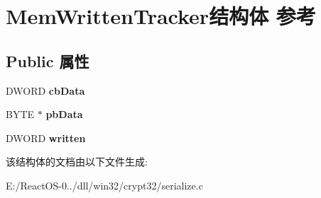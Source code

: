 \hypertarget{struct_mem_written_tracker}{}\section{Mem\+Written\+Tracker结构体 参考}
\label{struct_mem_written_tracker}
\subsection*{Public 属性}
\begin{DoxyCompactItemize}
\item 
\mbox{\label{struct_mem_written_tracker_a1839bfcc135b1152308ab371d1f5b65f}} 
D\+W\+O\+RD {\bfseries cb\+Data}
\item 
\mbox{\label{struct_mem_written_tracker_a1a649f9bcd01b59ad0204d835c8a9f0a}} 
B\+Y\+TE $\ast$ {\bfseries pb\+Data}
\item 
\mbox{\label{struct_mem_written_tracker_a5408708aa1020100bbba46a4d4b724f5}} 
D\+W\+O\+RD {\bfseries written}
\end{DoxyCompactItemize}


该结构体的文档由以下文件生成\+:\begin{DoxyCompactItemize}
\item 
E\+:/\+React\+O\+S-\/0../dll/win32/crypt32/serialize.\+c\end{DoxyCompactItemize}
